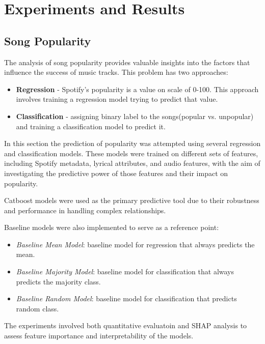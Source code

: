 \chapter{Experiments and Results}
\label{cha:experimentsandresults}

\section{Song Popularity}
\label{sec:songpopularity}

The analysis of song popularity provides valuable insights into the factors
that influence the success of music tracks. This problem has two approaches:
\begin{itemize}
  \item \textbf{Regression} - Spotify's popularity is a value on scale of
    0-100. This approach involves training a regression model trying to predict
    that value.
  \item \textbf{Classification} - assigning binary label to the songs(popular
    vs. unpopular) and training a classification model to predict it.
\end{itemize}

In this section the prediction of popularity was attempted using several
regression and classification models. These models were trained on different
sets of features, including Spotify metadata, lyrical attributes, and audio
features, with the aim of investigating the predictive power of those features
and their impact on popularity.

Catboost models were used as the primary predictive tool due to their
robustness and performance in handling complex relationships. 

Baseline models were also implemented to serve as a reference point:
\begin{itemize}
  \item \textit{Baseline Mean Model}: baseline model for regression that always predicts the mean.
  \item \textit{Baseline Majority Model}: baseline model for classification that always predicts the majority class.
  \item \textit{Baseline Random Model}: baseline model for classification that predicts random class.
\end{itemize}

The experiments involved both quantitative evaluatoin and SHAP analysis to
assess feature importance and interpretability of the models.

